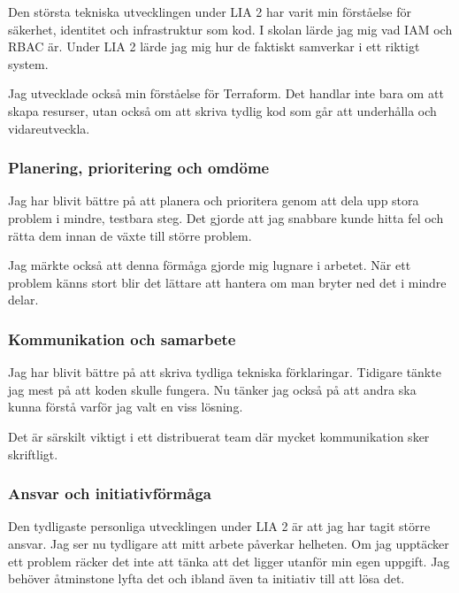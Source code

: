 Den största tekniska utvecklingen under LIA 2 har varit min förståelse för säkerhet,
identitet och infrastruktur som kod. I skolan lärde jag mig vad IAM och RBAC är. Under LIA 2
lärde jag mig hur de faktiskt samverkar i ett riktigt system.

Jag utvecklade också min förståelse för Terraform. Det handlar inte bara om att skapa resurser,
utan också om att skriva tydlig kod som går att underhålla och vidareutveckla.

\subsubsection{Planering, prioritering och omdöme}
\label{subsubsec:omdome_utveckling}

Jag har blivit bättre på att planera och prioritera genom att dela upp stora problem i mindre,
testbara steg. Det gjorde att jag snabbare kunde hitta fel och rätta dem innan de växte till
större problem.

Jag märkte också att denna förmåga gjorde mig lugnare i arbetet. När ett problem känns stort
blir det lättare att hantera om man bryter ned det i mindre delar.

\subsubsection{Kommunikation och samarbete}
\label{subsubsec:samarbete_utveckling}

Jag har blivit bättre på att skriva tydliga tekniska förklaringar. Tidigare tänkte jag mest på att
koden skulle fungera. Nu tänker jag också på att andra ska kunna förstå varför jag valt en viss
lösning.

Det är särskilt viktigt i ett distribuerat team där mycket kommunikation sker skriftligt.

\subsubsection{Ansvar och initiativförmåga}
\label{subsubsec:prestation_utveckling}

Den tydligaste personliga utvecklingen under LIA 2 är att jag har tagit större ansvar. Jag ser
nu tydligare att mitt arbete påverkar helheten. Om jag upptäcker ett problem räcker det inte att
tänka att det ligger utanför min egen uppgift. Jag behöver åtminstone lyfta det och ibland även
ta initiativ till att lösa det.